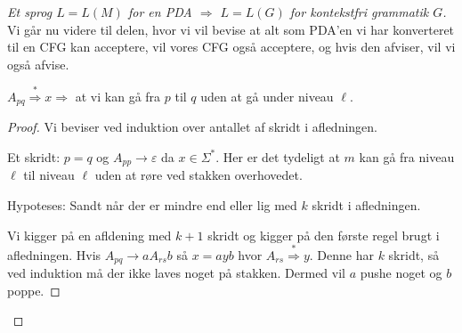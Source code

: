 \begin{proof}[Et sprog $L = L(M)$ for en PDA $\Rightarrow$ $L = L(G)$ for kontekstfri grammatik $G$]
	Vi går nu videre til delen, hvor vi vil bevise at alt som PDA'en vi har konverteret til en CFG kan acceptere, vil vores CFG også acceptere, og hvis den afviser, vil vi også afvise.

	\begin{claim}
		$A_{pq} \stackrel{*}{\Rightarrow} x \Rightarrow$ at vi kan gå fra $p$ til $q$ uden at gå under niveau \(\ell\).
	\end{claim}
	\begin{proof}
		Vi beviser ved induktion over antallet af skridt i afledningen.

		Et skridt: $p = q$ og $A_{pp} \rightarrow \varepsilon$ da $x \in \Sigma^{*}$. Her er det tydeligt at $m$ kan gå fra niveau \(\ell\) til niveau \(\ell\) uden at røre ved stakken overhovedet.

		Hypoteses: Sandt når der er mindre end eller lig med $k$ skridt i afledningen.

		Vi kigger på en afldening med $k+1$ skridt og kigger på den første regel brugt i afledningen. Hvis $A_{pq} \rightarrow aA_{rs}b$ så $x = ayb$ hvor $A_{rs} \stackrel{*}{\Rightarrow} y$. Denne har $k$ skridt, så ved induktion må der ikke laves noget på stakken. Dermed vil $a$ pushe noget og $b$ poppe.

	\end{proof}
\end{proof}




